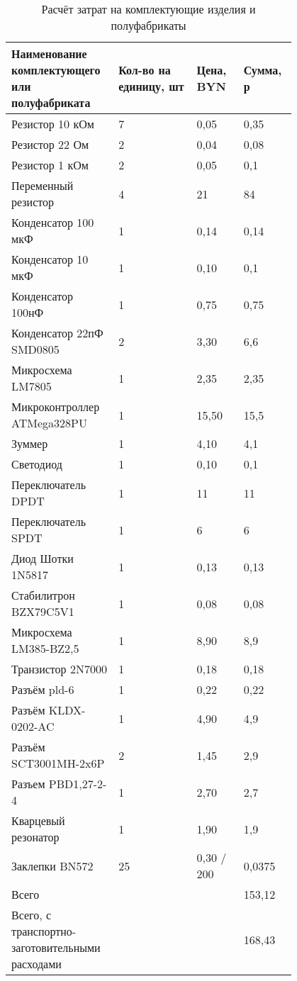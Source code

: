 \begin{table}[H]
  \caption{Расчёт затрат на комплектующие изделия и полуфабрикаты}
  \small
  \begin{tabular}{| p{0.25\linewidth} |  p{0.25\linewidth} |  p{0.15\linewidth} |  p{0.15\linewidth} |}
    \hline
Наименование комплектующего или полуфабриката & Кол-во на единицу, шт & Цена, BYN & Сумма, р\\[0pt]
\hline
  Резистор 10 кОм & 7 & 0,05 & 0,35 \\[0pt]
  \hline
  Резистор 22 Ом  & 2 & 0,04 & 0,08 \\[0pt]
  \hline
  Резистор 1 кОм  & 2 & 0,05 & 0,1\\[0pt]
  \hline
  Переменный резистор & 4 & 21 & 84\\[0pt]
  \hline
  Конденсатор 100 мкФ & 1 & 0,14 & 0,14\\[0pt]
  \hline
  Конденсатор 10 мкФ  & 1 & 0,10 & 0,1\\[0pt]
  \hline
  Конденсатор 100нФ & 1 & 0,75 & 0,75 \\[0pt]
  \hline
  Конденсатор 22пФ SMD0805 & 2 & 3,30 & 6,6\\[0pt]
  \hline
  Микросхема LM7805 & 1 & 2,35 & 2,35 \\[0pt]
  \hline
  Микроконтроллер ATMega328PU & 1 & 15,50 & 15,5 \\[0pt]
  \hline
  Зуммер & 1 & 4,10 & 4,1 \\[0pt]
  \hline
  Светодиод & 1 & 0,10 & 0,1 \\[0pt]
  \hline
  Переключатель DPDT & 1 & 11 & 11 \\[0pt]
  \hline
  Переключатель SPDT & 1 & 6 & 6\\[0pt]
  \hline
  Диод Шотки 1N5817 & 1 & 0,13 & 0,13 \\[0pt]
  \hline
  Стабилитрон BZX79C5V1 & 1 & 0,08 & 0,08 \\[0pt]
  \hline
  Микросхема LM385-BZ2,5 & 1 & 8,90 & 8,9\\[0pt]
  \hline
  Транзистор 2N7000 & 1 & 0,18 & 0,18 \\[0pt]
  \hline
  Разъём pld-6 & 1 & 0,22 & 0,22 \\[0pt]
  \hline
  Разъём KLDX-0202-AC & 1 & 4,90 & 4,9 \\[0pt]
  \hline
  Разъём SCT3001MH-2x6P & 2 & 1,45 & 2,9 \\[0pt]
  \hline
  Разъем PBD1,27-2-4 & 1 & 2,70 & 2,7 \\[0pt]
  \hline
  Кварцевый резонатор & 1 & 1,90 & 1,9\\[0pt]
  \hline
  Заклепки BN572 & 25 & 0,30 / 200 & 0,0375\\[0pt]
  \hline
  Всего &  &  & 153,12\\[0pt]
  \hline
  Всего, с транспортно-заготовительными расходами &  &  & 168,43\\[0pt]
  \hline
\end{tabular}
\end{table}

